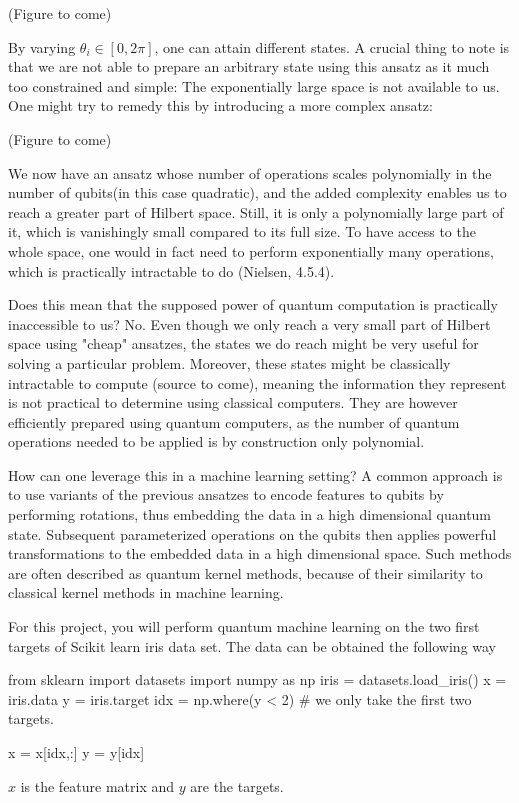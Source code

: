 \documentclass[%
oneside,                 %
final,                   %
10pt]{article}
\begin{document}
(Figure to come)

By varying $\theta_i \in [0, 2\pi]$, one can attain different states. A crucial thing to note is that we are not
able to prepare an arbitrary state using this ansatz as it much too constrained and simple: The exponentially large
space is not available to us. One might try to remedy this by introducing a more complex ansatz:

(Figure to come)

We now have an ansatz whose number of operations scales polynomially in the number of qubits(in this case quadratic), and the
added complexity enables us to reach a greater part of Hilbert space. Still, it is only a polynomially large part of it, which
is vanishingly small compared to its full size. To have access to the whole space, one would in fact need to perform exponentially
many operations, which is practically intractable to do (Nielsen, 4.5.4).

Does this mean that the supposed power of quantum computation is practically inaccessible to us? No. Even though we
only reach a very small part of Hilbert space using "cheap" ansatzes, the states we do reach might be very useful
for solving a particular problem. Moreover, these states might be classically intractable to compute (source to come),
meaning the information they represent is not practical to determine using classical computers. They are however efficiently
prepared using quantum computers, as the number of quantum operations needed to be applied is by construction only polynomial.

How can one leverage this in a machine learning setting? A common approach is to use variants of the previous ansatzes to encode features to qubits by performing rotations, thus embedding the data in a high dimensional quantum state. Subsequent parameterized operations on the qubits then applies powerful transformations to the embedded data in a high dimensional space. Such methods are often described as quantum kernel methods, because of their similarity to classical kernel methods in machine learning.

For this project, you will perform quantum machine learning on the two first targets of Scikit learn iris data set. The data can be obtained the following way

\begin{print}
from sklearn import datasets
import numpy as np
iris = datasets.load_iris()
x = iris.data
y = iris.target
idx = np.where(y < 2) # we only take the first two targets.

x = x[idx,:]
y = y[idx]
\end{print}
$x$ is the feature matrix and $y$ are the targets.
\end{document}
